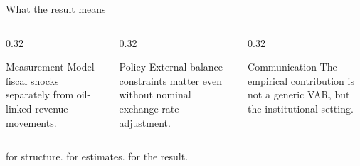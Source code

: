 \documentclass[aspectratio=169,10pt]{beamer}
\begin{document}
\begin{frame}{What the result means}
  \begin{columns}[T,onlytextwidth]
    \begin{column}{0.32\textwidth}
      \begin{block}{Measurement}
        Model fiscal shocks separately from oil-linked revenue movements.
      \end{block}
    \end{column}
    \begin{column}{0.32\textwidth}
      \begin{exampleblock}{Policy}
        External balance constraints matter even without nominal exchange-rate adjustment.
      \end{exampleblock}
    \end{column}
    \begin{column}{0.32\textwidth}
      \begin{alertblock}{Communication}
        The empirical contribution is not a generic VAR, but the institutional setting.
      \end{alertblock}
    \end{column}
  \end{columns}

  \vspace{0.45cm}
  \begin{center}
    {\Large{} for structure.  for estimates.  for the result.}
  \end{center}
\end{frame}
\end{document}

